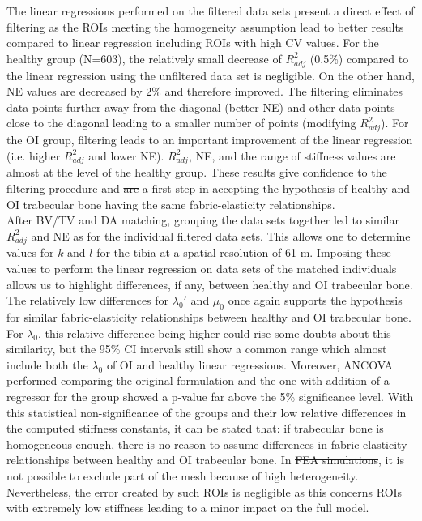\documentclass[a4paper,fleqn]{DC_ArtStyle}
\providecommand{\DIFadd}[1]{{\protect\color{blue}{#1}}} %
\providecommand{\DIFdel}[1]{{\protect\color{red}\sout{#1}}}                      %
\providecommand{\DIFaddbegin}{} %
\providecommand{\DIFaddend}{} %
\providecommand{\DIFdelbegin}{} %
\providecommand{\DIFdelend}{} %
\begin{document}
\DIFdelend The linear regressions performed on the filtered data sets present a direct effect of filtering as the ROIs meeting the homogeneity assumption lead to better results compared to linear regression including ROIs with high CV values. For the healthy group (N=603), the relatively small decrease of $R^2_{adj}$ (0.5\%) compared to the linear regression using the unfiltered data set is negligible. On the other hand, NE values are decreased by 2\% and therefore improved. The filtering eliminates data points further away from the diagonal (better NE) and other data points close to the diagonal leading to a smaller number of points (modifying $R^2_{adj}$). For the OI group, filtering leads to an important improvement of the linear regression (i.e. higher $R^2_{adj}$ and lower NE). $R^2_{adj}$, NE, and the range of stiffness values are almost at the level of the healthy group. These results give confidence to the filtering procedure and \DIFdelbegin \DIFdel{are }\DIFdelend \DIFaddbegin \DIFadd{represent }\DIFaddend a first step in accepting the hypothesis of healthy and OI trabecular bone having the same fabric-elasticity relationships.\\
\DIFdelbegin %

\DIFdelend After BV/TV and DA matching, grouping the data sets together led to similar $R^2_{adj}$ and NE as for the individual filtered data sets. This allows one to determine values for $k$ and $l$ for the tibia at a spatial resolution of 61 \si{\micro}m. Imposing these values to perform the linear regression on data sets of the matched individuals allows us to highlight differences, if any, between healthy and OI trabecular bone. The relatively low differences for $\lambda_0'$ and $\mu_0$ once again supports the hypothesis for similar fabric-elasticity relationships between healthy and OI trabecular bone. For $\lambda_0$, this relative difference being higher could rise some doubts about this similarity, but the 95\% CI intervals still show a common range which almost include both the $\lambda_0$ of OI and healthy linear regressions. Moreover, ANCOVA performed comparing the original formulation and the one with addition of a regressor for the group showed a p-value far above the 5\% significance level. With this statistical non-significance of the groups and their low relative differences in the computed stiffness constants, it can be stated that: if trabecular bone is homogeneous enough, there is no reason to assume differences in fabric-elasticity relationships between healthy and OI trabecular bone. In \DIFdelbegin \DIFdel{FEA simulations}\DIFdelend \DIFaddbegin \DIFadd{hFE analysis of bones}\DIFaddend , it is not possible to exclude part of the mesh because of high heterogeneity. Nevertheless, the error created by such ROIs is negligible as this concerns ROIs with extremely low \DIFaddbegin \DIFadd{BV/TV and therefore }\DIFaddend stiffness leading to a minor impact on the full model.\\
\DIFdelbegin %
\end{document}
